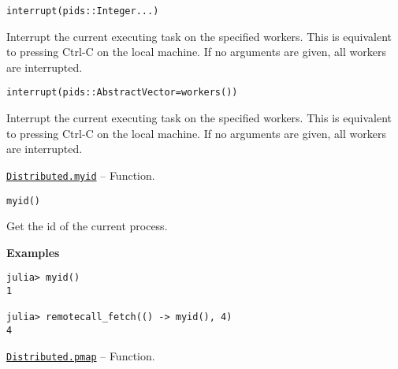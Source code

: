 \begin{adjustwidth}{2em}{0pt}


\begin{verbatim}
interrupt(pids::Integer...)
\end{verbatim}

Interrupt the current executing task on the specified workers. This is equivalent to pressing Ctrl-C on the local machine. If no arguments are given, all workers are interrupted.




\begin{lstlisting}
interrupt(pids::AbstractVector=workers())
\end{lstlisting}

Interrupt the current executing task on the specified workers. This is equivalent to pressing Ctrl-C on the local machine. If no arguments are given, all workers are interrupted.



\end{adjustwidth}
\hypertarget{15079655651797922234}{}
\hyperlink{15079655651797922234}{\texttt{Distributed.myid}}  -- {Function.}

\begin{adjustwidth}{2em}{0pt}


\begin{verbatim}
myid()
\end{verbatim}

Get the id of the current process.

\textbf{Examples}


\begin{verbatim}
julia> myid()
1

julia> remotecall_fetch(() -> myid(), 4)
4
\end{verbatim}



\end{adjustwidth}
\hypertarget{9432281416771383761}{}
\hyperlink{9432281416771383761}{\texttt{Distributed.pmap}}  -- {Function.}

